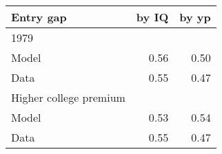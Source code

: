 \begin{tabular}{lrr}
\hline
Entry gap & by IQ  & by yp  \\ 
\hline
1979 &   &   \\ 
Model & 0.56  & 0.50  \\ 
Data & 0.55  & 0.47  \\ 
Higher college premium &   &   \\ 
Model & 0.53  & 0.54  \\ 
Data & 0.55  & 0.47  \\ 
\hline
\end{tabular}%
